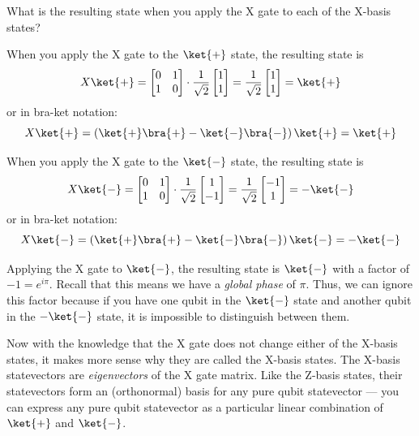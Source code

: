 \documentclass{article}
\theoremstyle{definition}
\newcommand{\kx}[1]{\ket{#1}}
\newcommand{\bx}[1]{\bra{#1}}
\begin{document}
\begin{example}
	What is the resulting state when you apply the X gate to each of the X-basis states?

	\textnormal{When you apply the X gate to the $\kx+$ state, the resulting state is}
	\begin{equation}
		X \kx+ = \begin{bmatrix}
			0 & 1\\
			1 & 0
		\end{bmatrix} \cdot \frac{1}{\sqrt{2}}\begin{bmatrix}
			1\\
			1
		\end{bmatrix} = \frac{1}{\sqrt{2}}\begin{bmatrix}
			1\\
			1
		\end{bmatrix} = \kx+
	\end{equation}
	\textnormal{or in bra-ket notation:}
	\begin{equation}
		X \kx+ = \left(\kx{+}\bx{+} - \kx{-}\bx{-}\right) \kx+ = \kx+
	\end{equation}

	\textnormal{When you apply the X gate to the $\kx-$ state, the resulting state is}
	\begin{equation}
		X \kx- = \begin{bmatrix}
			0 & 1\\
			1 & 0
		\end{bmatrix} \cdot \frac{1}{\sqrt{2}}\begin{bmatrix}
			1\\
			-1
		\end{bmatrix} = \frac{1}{\sqrt{2}}\begin{bmatrix}
			-1\\
			1
		\end{bmatrix} = -\kx-
	\end{equation}
	\textnormal{or in bra-ket notation:}
	\begin{equation}
		X \kx- = \left(\kx{+}\bx{+} - \kx{-}\bx{-}\right) \kx- = -\kx-
	\end{equation}

	\textnormal{Applying the X gate to $\kx-$, the resulting state is $\kx-$ with a factor of $-1 = e^{i \pi}$.  Recall that this means we have a \textit{global phase} of $\pi$.  Thus, we can ignore this factor because if you have one qubit in the $\kx-$ state and another qubit in the $-\kx-$ state, it is impossible to distinguish between them.}

	\textnormal{Now with the knowledge that the X gate does not change either of the X-basis states, it makes more sense why they are called the X-basis states.  The X-basis statevectors are \textit{eigenvectors} of the X gate matrix.  Like the Z-basis states, their statevectors form an (orthonormal) basis for any pure qubit statevector --- you can express any pure qubit statevector as a particular linear combination of $\kx+$ and $\kx-$.}
\end{example}
\end{document}
